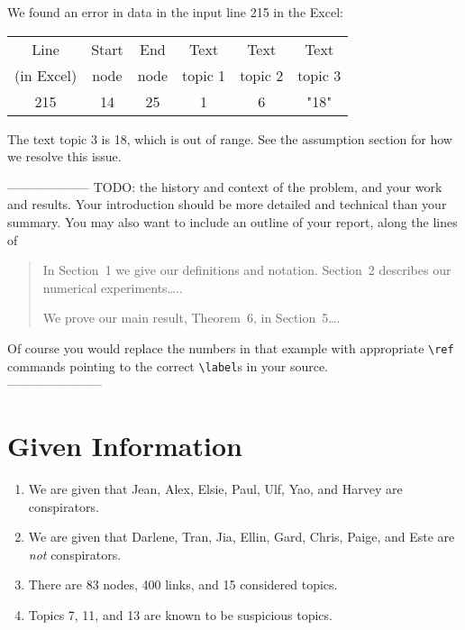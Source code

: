 \documentclass{icmmcm}
\begin{document}
We found an error in data in the input line 215 in the Excel:

\begin{center}
\begin{tabular}{|c|c|c|c|c|c|}
\hline
Line    & Start        & End       & Text      & Text       & Text \\
(in Excel)&  node      &   node     & topic 1  &  topic 2   &  topic 3 \\
\hline
215     &     14     &    25    &       1      &       6      &      "18"  \\
\hline
\end{tabular}
\end{center}

The text topic 3 is 18, which is out of range.
See the assumption section for how we resolve this issue.

\noindent -------------------- TODO:
the history and context of the problem,
and your work and results.  Your introduction should be more detailed
and technical than your summary.  You may also want to include an
outline of your report, along the lines of
\begin{quotation}
  In Section~1 we give our definitions and notation. Section~2
  describes our numerical experiments\ldots{}..
  
  We prove our main result, Theorem~6, in Section~5\ldots{}.
\end{quotation}
Of course you would replace the numbers in that example with
appropriate \verb|\ref| commands pointing to the correct
\verb|\label|s in your source.\\
-----------------------

\section{Given Information}
\begin{enumerate}
\item We are given that Jean, Alex, Elsie, Paul, Ulf, Yao,
and Harvey are conspirators.
\item We are given that Darlene, Tran, Jia, Ellin, Gard, Chris,
Paige, and Este are \textit{not} conspirators.
\item There are 83 nodes, 400 links, and 15 considered topics.
\item Topics 7, 11, and 13 are known to be suspicious topics.
\end{enumerate}
\end{document}
